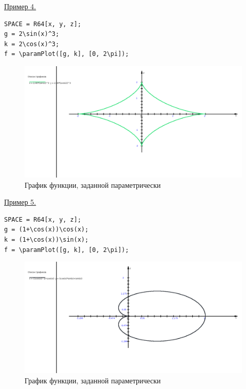 \eject
\underline{Пример 4. }



\vspace*{-2mm}
\begin{verbatim}
SPACE = R64[x, y, z];
g = 2\sin(x)^3; 
k = 2\cos(x)^3;
f = \paramPlot([g, k], [0, 2\pi]);
\end{verbatim}
\vspace*{-2mm}


\begin{figure}[h!]
 \includegraphics[scale=0.3]{pictures/2_4}
\vspace*{-10mm}
\caption{График функции, заданной параметрически}
\label{2_4}
\end{figure}



\underline{Пример 5. }

\vspace*{-2mm}
\begin{verbatim}
SPACE = R64[x, y, z];
g = (1+\cos(x))\cos(x); 
k = (1+\cos(x))\sin(x);
f = \paramPlot([g, k], [0, 2\pi]);
\end{verbatim}
\vspace*{-2mm}

\begin{figure}[h!]
 \includegraphics[scale=0.3]{pictures/2_5}
\vspace*{-10mm}
\caption{График функции, заданной параметрически}
\label{2_5}
\end{figure}

